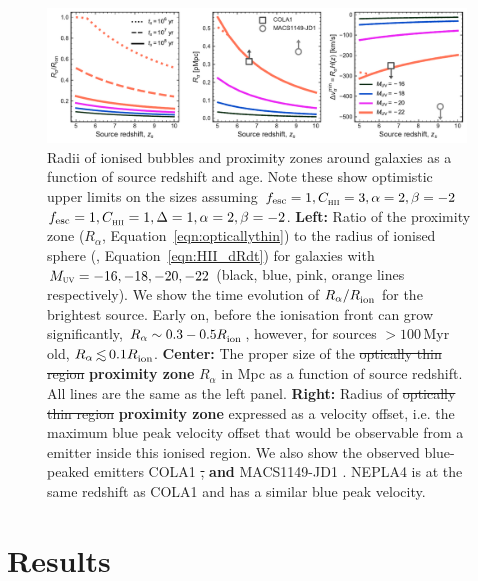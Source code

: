 \documentclass[fleqn,usenatbib]{mnras}
\providecommand{\DIFadd}[1]{{\protect\color{Green} {\bf #1}}} %
\providecommand{\DIFdel}[1]{{\protect\color{Gray} \scriptsize \sout{#1}}} %
\providecommand{\DIFaddFL}[1]{\DIFadd{#1}} %
\providecommand{\DIFdelFL}[1]{\DIFdel{#1}} %
\providecommand{\DIFaddbeginFL}{} %
\providecommand{\DIFaddendFL}{} %
\providecommand{\DIFdelbeginFL}{} %
\providecommand{\DIFdelendFL}{} %
\newcommand{\DIFscaledelfig}{0.5}
\newlength{\DIFdelgraphicswidth} %
\newlength{\DIFdelgraphicsheight} %
\newcommand{\DIFaddincludegraphics}[2][]{{\color{purple}\fbox{\DIFOincludegraphics[#1]{#2}}}} %
\newcommand{\DIFdelincludegraphics}[2][]{%
\sbox{\DIFdelgraphicsbox}{\DIFOincludegraphics[#1]{#2}}%
\settoboxwidth{\DIFdelgraphicswidth}{\DIFdelgraphicsbox} %
\settoboxtotalheight{\DIFdelgraphicsheight}{\DIFdelgraphicsbox} %
\scalebox{\DIFscaledelfig}{%
\parbox[b]{\DIFdelgraphicswidth}{\usebox{\DIFdelgraphicsbox}\\[-\baselineskip] \rule{\DIFdelgraphicswidth}{0em}}\llap{\resizebox{\DIFdelgraphicswidth}{\DIFdelgraphicsheight}{%
\setlength{\unitlength}{\DIFdelgraphicswidth}%
\begin{picture}(1,1)%
\thicklines\linethickness{2pt} %
{\color[rgb]{1,0,0}\put(0,0){\framebox(1,1){}}}%
{\color[rgb]{1,0,0}\put(0,0){\line( 1,1){1}}}%
{\color[rgb]{1,0,0}\put(0,1){\line(1,-1){1}}}%
\end{picture}%
}\hspace*{3pt}}} %
} %
\DeclareRobustCommand{\DIFaddbeginFL}{\DIFOaddbeginFL \let\includegraphics\DIFaddincludegraphics} %
\DeclareRobustCommand{\DIFaddendFL}{\DIFOaddendFL \let\includegraphics\DIFOincludegraphics} %
\DeclareRobustCommand{\DIFdelbeginFL}{\DIFOdelbeginFL \let\includegraphics\DIFdelincludegraphics} %
\DeclareRobustCommand{\DIFdelendFL}{\DIFOaddendFL \let\includegraphics\DIFOincludegraphics} %
\begin{document}
\begin{figure}
    \includegraphics[width=0.99\textwidth]{figs/fig4.pdf}
    \caption{Radii of ionised bubbles and \lya proximity zones around galaxies as a function of source redshift and age. Note these show optimistic upper limits on the sizes assuming \DIFdelbeginFL \DIFdelFL{$\fesc=1, \clump=3, \alpha=2, \beta=-2$}\DIFdelendFL \DIFaddbeginFL \DIFaddFL{$\fesc=1, \clump=1, \Delta=1, \alpha=2, \beta=-2$}\DIFaddendFL . \textbf{Left:} Ratio of the \lya proximity zone ($R_\alpha$, Equation~\ref{eqn:opticallythin}) to the radius of ionised sphere (\Rion, Equation~\ref{eqn:HII_dRdt}) for galaxies with $\MUV = -16, -18, -20, -22$ (black, blue, pink, orange lines respectively). We show the time evolution of $R_\alpha/\Rion$ for the brightest source. Early on, before the ionisation front can grow significantly, $R_\alpha \sim 0.3-0.5 \Rion$, however, for sources $>100$\,Myr old, $R_\alpha \simlt 0.1 \Rion$. \textbf{Center:} The proper size of the \DIFdelbeginFL \DIFdelFL{optically thin region }\DIFdelendFL \DIFaddbeginFL \DIFaddFL{proximity zone }\DIFaddendFL $R_\alpha$ in Mpc as a function of source redshift. All lines are the same as the left panel. \textbf{Right:} Radius of \DIFdelbeginFL \DIFdelFL{optically thin region }\DIFdelendFL \DIFaddbeginFL \DIFaddFL{proximity zone }\DIFaddendFL expressed as a \lya velocity offset, i.e. the maximum \lya blue peak velocity offset that would be observable from a \lya emitter inside this ionised region. We also show the observed blue-peaked \lya emitters COLA1 \citep{Hu2016,Matthee2018b} \DIFdelbeginFL \DIFdelFL{, }\DIFdelendFL \DIFaddbeginFL \DIFaddFL{and }\DIFaddendFL MACS1149-JD1 \citep{Hashimoto2018a}. NEPLA4 \citep{Songaila2018} is at the same redshift as COLA1 and has a similar blue peak velocity.}
    \label{fig:R_HII}
\end{figure}

\section{Results}
\label{sec:results}
\end{document}
